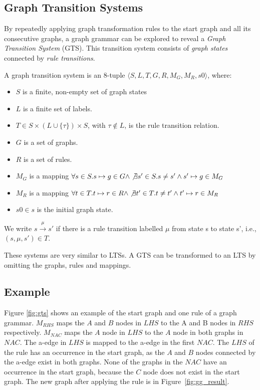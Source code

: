 \subsection{Graph Transition Systems}
By repeatedly applying graph transformation rules to the start graph and all its consecutive graphs, a graph grammar can be explored to reveal a \textit{Graph Transition System} (GTS). This transition system consists of \textit{graph states} connected by \textit{rule transitions}.
\vspace{5px}
\begin{definition}
A graph transition system is an 8-tuple	$\langle S, L, T, G, R, M_G, M_R, s0\rangle$, where:
\begin{itemize}
\item $S$ is a finite, non-empty set of graph states
\item $L$ is a finite set of labels.
\item $T \in S \times (L \cup \{\tau\}) \times S$, with $\tau \notin L$, is the rule transition relation.
\item $G$ is a set of graphs.
\item $R$ is a set of rules.
\item $M_G$ is a mapping $\forall s \in S . s \mapsto g \in G \land \not\exists s' \in S . s \neq s' \land s' \mapsto g \in M_G$
\item $M_R$ is a mapping $\forall t \in T . t \mapsto r \in R \land \not\exists t' \in T . t \neq t' \land t' \mapsto r \in M_R$
\item $s0 \in s$ is the initial graph state.
\end{itemize}
We write $s \xrightarrow{\mu}s'$ if there is a rule transition labelled $\mu$ from state s to state s', i.e., $(s, \mu, s') \in T$.
\end{definition}

These systems are very similar to LTSs. A GTS can be transformed to an LTS by omitting the graphs, rules and mappings.

\subsection{Example}\label{sec:gts_example}
Figure \ref{fig:gts} shows an example of the start graph and one rule of a graph grammar. $\mathit{M_{RHS}}$ maps the $A$ and $B$ nodes in $\mathit{LHS}$ to the A and B nodes in $\mathit{RHS}$ respectively. $\mathit{M_{NAC}}$ maps the $A$ node in $\mathit{LHS}$ to the $A$ node in both graphs in $\mathit{NAC}$. The a-edge in $\mathit{LHS}$ is mapped to the a-edge in the first $\mathit{NAC}$. The $\mathit{LHS}$ of the rule has an occurrence in the start graph, as the $A$ and $B$ nodes connected by the a-edge exist in both graphs. None of the graphs in the $\mathit{NAC}$ have an occurrence in the start graph, because the $C$ node does not exist in the start graph. The new graph after applying the rule is in Figure~\ref{fig:gg_result}.

